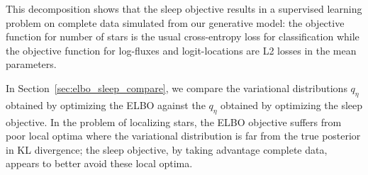 This decomposition shows that the sleep objective results in a supervised learning problem on complete data simulated from our generative model: the objective function for number of stars is the usual cross-entropy loss for classification while the objective function for log-fluxes and logit-locations are L2 losses in the mean parameters. 

In Section~\ref{sec:elbo_sleep_compare}, 
we compare the variational distributions $q_\eta$ 
obtained by optimizing the ELBO against the $q_\eta$ obtained by optimizing the sleep objective.
In the problem of localizing stars,
the ELBO objective suffers from poor local optima where the variational distribution is far from the true posterior in KL divergence; the sleep objective, by taking advantage complete data, appears to better avoid these local optima. 




